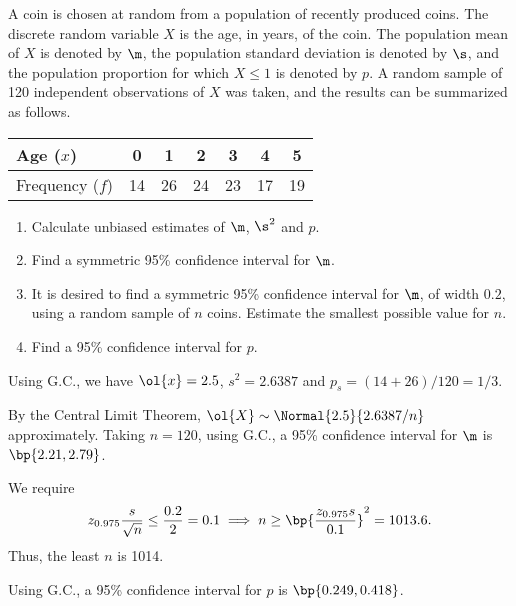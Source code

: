 \begin{problem}
    A coin is chosen at random from a population of recently produced coins. The discrete random variable $X$ is the age, in years, of the coin. The population mean of $X$ is denoted by $\m$, the population standard deviation is denoted by $\s$, and the population proportion for which $X\leq1$ is denoted by $p$. A random sample of 120 independent observations of $X$ was taken, and the results can be summarized as follows.

    \begin{table}[H]
        \centering
        \begin{tabular}{|l|c|c|c|c|c|c|}
            \hline
            Age ($x$) & 0 & 1 & 2 & 3 & 4 & 5 \\ \hline
            Frequency ($f$) & 14 & 26 & 24 & 23 & 17 & 19 \\ \hline
        \end{tabular}
    \end{table}

    \begin{enumerate}
        \item Calculate unbiased estimates of $\m$, $\s^2$ and $p$.
        \item Find a symmetric 95\% confidence interval for $\m$.
        \item It is desired to find a symmetric 95\% confidence interval for $\m$, of width $0.2$, using a random sample of $n$ coins. Estimate the smallest possible value for $n$.
        \item Find a 95\% confidence interval for $p$.
    \end{enumerate}
\end{problem}
\begin{solution}
    \begin{ppart}
        Using G.C., we have $\ol{x} = 2.5$, $s^2 = 2.6387$ and $p_s = (14+26)/120 = 1/3$.
    \end{ppart}
    \begin{ppart}
        By the Central Limit Theorem, $\ol{X} \sim \Normal{2.5}{2.6387/n}$ approximately. Taking $n = 120$, using G.C., a 95\% confidence interval for $\m$ is $\bp{2.21, 2.79}$.
    \end{ppart}
    \begin{ppart}
        We require \[z_{0.975} \frac{s}{\sqrt{n}} \leq \frac{0.2}{2} = 0.1 \implies n \geq \bp{\frac{z_{0.975} s}{0.1}}^2 = 1013.6.\] Thus, the least $n$ is 1014.
    \end{ppart}
    \begin{ppart}
        Using G.C., a 95\% confidence interval for $p$ is $\bp{0.249, 0.418}$.
    \end{ppart}
\end{solution}

